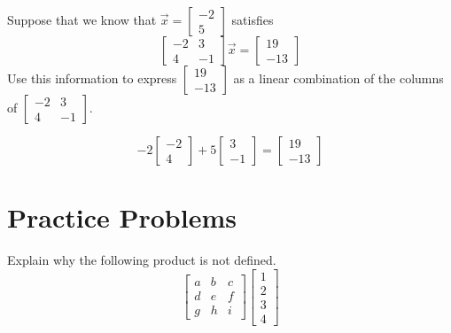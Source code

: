 \documentclass{ximera}
\begin{document}
\begin{example}\label{ex:linearcombofcols1}
Suppose that we know that $\vec{x}=\begin{bmatrix} -2\\5\end{bmatrix}$ satisfies
$$\begin{bmatrix}
-2&3\\
4&-1
\end{bmatrix}\vec{x}=\begin{bmatrix} 19\\-13\end{bmatrix}$$
Use this information to express $\begin{bmatrix} 19\\-13\end{bmatrix}$ as a linear combination of the columns of $\begin{bmatrix}
-2&3\\
4&-1
\end{bmatrix}$.
\begin{explanation}
$$-2\begin{bmatrix} -2\\4\end{bmatrix}+5\begin{bmatrix} 3\\-1\end{bmatrix}=\begin{bmatrix} 19\\-13\end{bmatrix}$$
\end{explanation}

\end{example}






\section*{Practice Problems}

\begin{problem}\label{prob:matprodundefined} Explain why the following product is not defined.
$$\begin{bmatrix}a&b&c\\d&e&f\\g&h&i\end{bmatrix}\begin{bmatrix}1\\2\\3\\4\end{bmatrix}$$
\end{problem}
\end{document}
